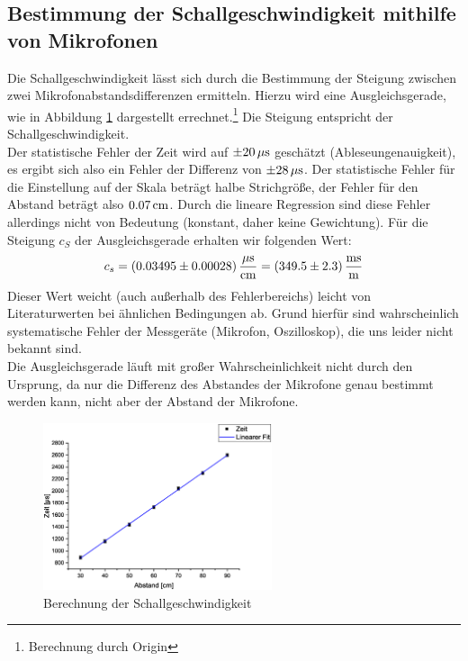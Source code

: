 \subsection{Bestimmung der Schallgeschwindigkeit mithilfe von Mikrofonen}
Die Schallgeschwindigkeit lässt sich durch die Bestimmung der Steigung zwischen zwei Mikrofonabstandsdifferenzen ermitteln. Hierzu wird eine Ausgleichsgerade, wie in Abbildung \ref{fig:aufgabe3} dargestellt errechnet.\footnote{Berechnung durch Origin} Die Steigung entspricht der Schallgeschwindigkeit.\\
Der statistische Fehler der Zeit wird auf $\pm \unit[20]{\mu s}$ geschätzt (Ableseungenauigkeit), es ergibt sich also ein Fehler der Differenz von $\pm \unit[28]{\mu s}$. Der statistische Fehler für die Einstellung auf der Skala beträgt halbe Strichgröße, der Fehler für den Abstand beträgt also $\unit[0.07]{cm}$. Durch die lineare Regression sind diese Fehler allerdings nicht von Bedeutung (konstant, daher keine Gewichtung). Für die Steigung $c_S$ der Ausgleichsgerade erhalten wir folgenden Wert:
\begin{equation}
c_s = \unit[(0.03495 \pm 0.00028)]{\frac{\mu s}{cm}} = \unit[(349.5 \pm 2.3)]{\frac{ms}{m}}
\end{equation}
Dieser Wert weicht (auch außerhalb des Fehlerbereichs) leicht von Literaturwerten bei ähnlichen Bedingungen ab. Grund hierfür sind wahrscheinlich systematische Fehler der Messgeräte (Mikrofon, Oszilloskop), die uns leider nicht bekannt sind.\\
Die Ausgleichsgerade läuft mit großer Wahrscheinlichkeit nicht durch den Ursprung, da nur die Differenz des Abstandes der Mikrofone genau bestimmt werden kann, nicht aber der Abstand der Mikrofone.

\begin{figure}
\begin{center}
\includegraphics[width=0.6\textwidth]{Bilder/aufgabe3.eps}
\caption{Berechnung der Schallgeschwindigkeit}
\label{fig:aufgabe3}
\end{center}
\end{figure}